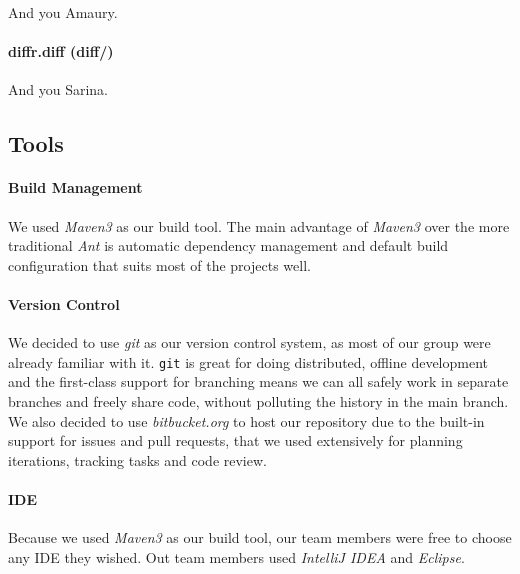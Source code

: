And you Amaury.

\paragraph{diffr.diff (diff/)}

And you Sarina.

\subsection{Tools}

\paragraph{Build Management}

We used \textit{Maven3} as our build tool. The main advantage of \textit{Maven3} over the more traditional \textit{Ant} is automatic dependency management and default build configuration that suits most of the projects well.

\paragraph{Version Control}
We decided to use \textit{git} as our version control system, as most of our group were already familiar with it. \texttt{git} is great for doing distributed, offline development and the first-class support for branching means we can all safely work in separate branches and freely share code, without polluting the history in the main branch. We also decided to use \textit{bitbucket.org} to host our repository due to the built-in support for issues and pull requests, that we used extensively for planning iterations, tracking tasks and code review.

\paragraph{IDE}
Because we used \textit{Maven3} as our build tool, our team members were free to choose any IDE they wished. Out team members used \textit{IntelliJ IDEA} and \textit{Eclipse}.

